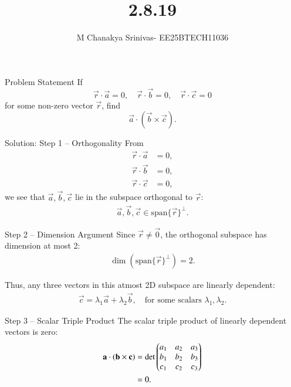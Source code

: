 \documentclass{beamer}
\title %
{2.8.19}
\date{}
\author %
{M Chanakya Srinivas- EE25BTECH11036}
\begin{document}
\frame{\titlepage}




\begin{frame}{Problem Statement}
If 
\[
\vec{r} \cdot \vec{a} = 0, \quad 
\vec{r} \cdot \vec{b} = 0, \quad 
\vec{r} \cdot \vec{c} = 0
\]
for some non-zero vector $\vec{r}$, find
\[
\vec{a} \cdot (\vec{b} \times \vec{c}).
\]
\end{frame}

\begin{frame}{Solution: Step 1 -- Orthogonality}
From
\begin{align}
\vec{r} \cdot \vec{a} &= 0, \label{eq:1} \\
\vec{r} \cdot \vec{b} &= 0, \label{eq:2} \\
\vec{r} \cdot \vec{c} &= 0, \label{eq:3}
\end{align}
we see that $\vec{a}, \vec{b}, \vec{c}$ lie in the subspace orthogonal to $\vec{r}$:
\begin{align}
\vec{a}, \vec{b}, \vec{c} \in \text{span}\{\vec{r}\}^{\perp}. \label{eq:4}
\end{align}
\end{frame}

\begin{frame}{Step 2 -- Dimension Argument}
Since $\vec{r} \neq \vec{0}$, the orthogonal subspace has dimension at most 2:
\begin{align}
\dim(\text{span}\{\vec{r}\}^{\perp}) = 2. \label{eq:5}
\end{align}

Thus, any three vectors in this atmost 2D subspace are linearly dependent:
\begin{align}
\vec{c} = \lambda_1 \vec{a} + \lambda_2 \vec{b}, \quad \text{for some scalars } \lambda_1, \lambda_2. \label{eq:6}
\end{align}
\end{frame}

\begin{frame}{Step 3 -- Scalar Triple Product}
The scalar triple product of linearly dependent vectors is zero:
\begin{align}
\mathbf{a} \cdot (\mathbf{b} \times \mathbf{c})
&= \det 
\begin{pmatrix}
a_1 & a_2 & a_3 \\
b_1 & b_2 & b_3 \\
c_1 & c_2 & c_3
\end{pmatrix} \label{eq:7} \\
&= 0. \label{eq:8}
\end{align}
\end{frame}
\end{document}
